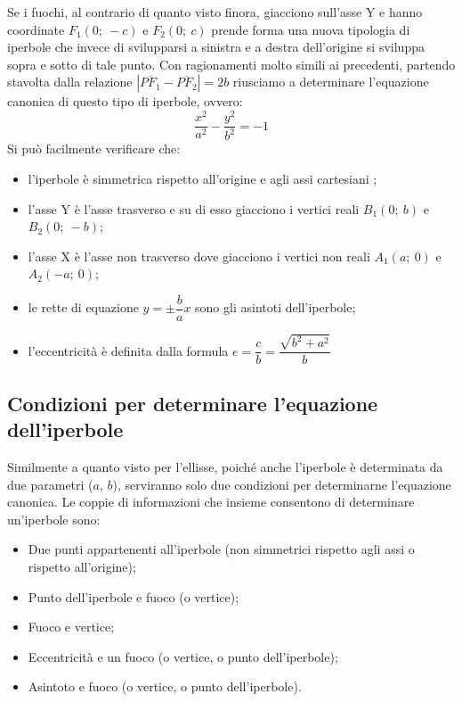 Se i fuochi, al contrario di quanto visto finora, giacciono sull'asse Y e 
hanno coordinate $ F_{1} (0;~-c)$ e $ F_{2} (0;~c)$ prende forma una nuova 
tipologia di iperbole che invece di svilupparsi a sinistra e a destra 
dell'origine si sviluppa sopra e sotto di tale punto.
Con ragionamenti molto simili ai precedenti, partendo stavolta dalla relazione 
$\left|\overline{PF_{1}}-\overline{PF_{2}}\right|=2b$ riusciamo a 
determinare l'equazione canonica di questo tipo di iperbole, ovvero: 
\begin{equation}
\dfrac{x^{2}}{a^{2}}-\dfrac{y^{2}}{b^{2}}=-1
\end{equation}
Si può facilmente verificare che:
\begin{itemize} [noitemsep]
  \item l'iperbole è simmetrica rispetto all'origine e agli assi 
cartesiani ;
  \item l'asse Y è l'asse trasverso e su di esso giacciono i vertici 
reali $ B_{1} (0;~b)$ e $ B_{2} (0;~-b)$;
  \item l'asse X è l'asse non trasverso dove giacciono i vertici non 
reali $ A_{1} (a;~0)$ e $ A_{2} (-a;~0)$;
  \item le rette di equazione $y= \pm \dfrac{b}{a}  x$ sono gli asintoti dell'iperbole;
  \item l'eccentricità è definita dalla formula 
$e=\dfrac{c}{b}=\dfrac{\sqrt{b^{2}+a^{2}}}{b} $
\end{itemize}

\subsection{Condizioni per determinare l'equazione dell'iperbole}

Similmente a quanto visto per l'ellisse, poiché anche l'iperbole 
è determinata da due parametri ($a$, $b$), serviranno solo due condizioni per 
determinarne l'equazione canonica.
Le coppie di informazioni che insieme consentono di determinare un'iperbole 
sono:
\begin{itemize}[noitemsep]
\item Due punti appartenenti all'iperbole (non simmetrici rispetto 
agli assi o rispetto all'origine);
\item Punto dell'iperbole e fuoco (o vertice);
\item Fuoco e vertice;
\item Eccentricità e un fuoco (o vertice, o punto dell'iperbole);
\item Asintoto e fuoco (o vertice, o punto dell'iperbole).
\end{itemize}

